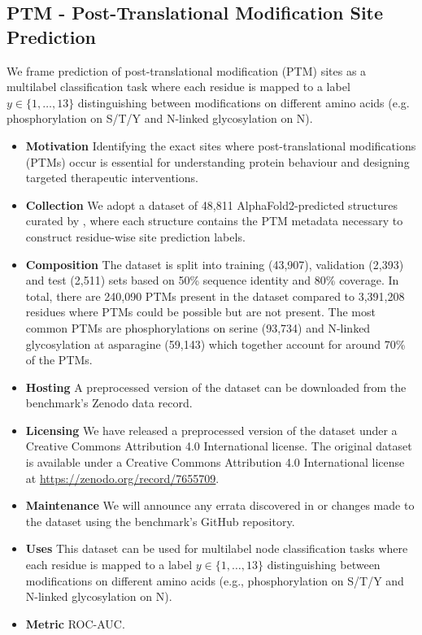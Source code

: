 \subsection{PTM - Post-Translational Modification Site Prediction}
We frame prediction of post-translational modification (PTM) sites as a multilabel classification task where each residue is mapped to a label $y \in \{1, \dots, 13\}$ distinguishing between modifications on different amino acids (e.g. phosphorylation on S/T/Y and N-linked glycosylation on N).

\begin{itemize}
    \item \textbf{Motivation} Identifying the exact sites where post-translational modifications (PTMs) occur is essential for understanding protein behaviour and designing targeted therapeutic interventions.
    \item \textbf{Collection} We adopt a dataset of 48,811 AlphaFold2-predicted structures curated by \citet{Yan2023}, where each structure contains the PTM metadata necessary to construct residue-wise site prediction labels.
    \item \textbf{Composition} The dataset is split into training (43,907), validation (2,393) and test (2,511) sets based on 50\% sequence identity and 80\% coverage.
    In total, there are 240,090 PTMs present in the dataset compared to 3,391,208 residues where PTMs could be possible but are not present. The most common PTMs are phosphorylations on serine (93,734) and N-linked glycosylation at asparagine (59,143) which together account for around 70\% of the PTMs. 
    \item \textbf{Hosting} A preprocessed version of the dataset can be downloaded from the benchmark's Zenodo data record.%
    \item \textbf{Licensing} We have released a preprocessed version of the dataset under a Creative Commons Attribution 4.0 International license. The original dataset is available under a Creative Commons Attribution 4.0 International license at \url{https://zenodo.org/record/7655709}.
    \item \textbf{Maintenance} We will announce any errata discovered in or changes made to the dataset using the benchmark's GitHub repository.%
    \item \textbf{Uses} This dataset can be used for multilabel node classification tasks where each residue is mapped to a label $y \in \{1, \dots, 13\}$ distinguishing between modifications on different amino acids (e.g., phosphorylation on S/T/Y and N-linked glycosylation on N).
    \item \textbf{Metric} ROC-AUC.
\end{itemize}

